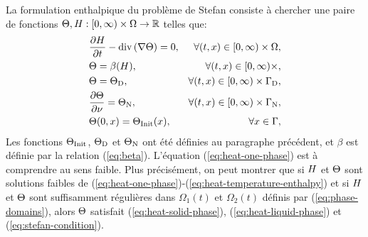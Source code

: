 La formulation enthalpique du problème de Stefan consiste à chercher
une paire de fonctions
$\Theta,H:[0,\infty)\times\Omega\to\mathbb R$
telles que:
\begin{align}
  & \frac{\partial \enthalpydensity}{\partial t} %
  - \div\parent{ \nabla \temperature} = 0,%
  & \forall (t, x) \in [0,\infty)\times
    \Omega,\label{eq:heat-one-phase}\\
  & \temperature = \beta(\enthalpydensity),
    &\forall (t, x) \in [0,\infty)\times,\label{eq:heat-temperature-enthalpy}\\
  & \temperature = \temperature_\mathrm{D}, %
  & \forall (t, x) \in [0,\infty)\times \Gamma_\mathrm{D},\label{eq:heat-one-phase-dirichlet}\\
  & \frac{\partial \temperature}{\partial \nu} = \temperature_\mathrm{N}, %
  & \forall (t, x) \in [0,\infty)\times \Gamma_\mathrm{N},\label{eq:heat-one-phase-neumann}\\
  & \temperature(0, x) = \tinit(x),
  & \forall x\in\Gamma,\label{eq:heat-initial-condition}
\end{align}
Les fonctions $\Theta_\text{Init}$, $\Theta_\mathrm{D}$ et
$\Theta_\mathrm{N}$ ont été définies au paragraphe précédent, et
$\beta$ est définie par la relation (\ref{eq:beta}). L'équation
(\ref{eq:heat-one-phase}) est à comprendre au sens faible. Plus
précisément, on peut montrer que si $H$ et
$\Theta$ sont solutions faibles de
(\ref{eq:heat-one-phase})-(\ref{eq:heat-temperature-enthalpy}) et si
$H$ et $\Theta$ sont suffisamment régulières dans
$\Omega_1(t)$ et $\Omega_2(t)$ définis par (\ref{eq:phase-domains}),
alors $\Theta$ satisfait (\ref{eq:heat-solid-phase}),
(\ref{eq:heat-liquid-phase}) et (\ref{eq:stefan-condition}).


